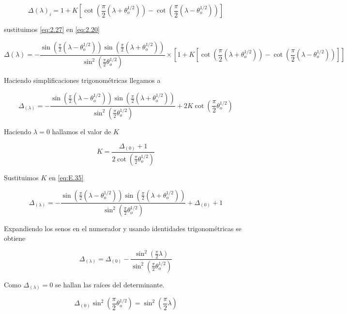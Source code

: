  \begin{equation}\label{eq:2.27}
     \Delta(\lambda)_{i}=1+K[\cot(\frac{\pi}{2}(\lambda+\theta_o^{1/2}))-\cot(\frac{\pi}{2}(\lambda-\theta_o^{1/2}))]
 \end{equation}
  
 sustituimos \ref{eq:2.27} en \ref{eq:2.20}
 
 \begin{equation}\label{eq:E.33}
    \Delta(\lambda)= -\frac{\sin(\frac{\pi}{2}(\lambda-\theta_o^{1/2}))\sin(\frac{\pi}{2}(\lambda+ \theta_o^{1/2}))}{\sin^2(\frac{\pi}{2}\theta_o^{1/2})}\times\left[1+K\left[\cot(\frac{\pi}{2}(\lambda+\theta_o^{1/2}))-\cot(\frac{\pi}{2}(\lambda-\theta_o^{1/2}))\right]\right]
\end{equation}

Haciendo simplificaciones trigonométricas llegamos a

\begin{equation}\label{eq:E.35}
    \Delta_{(\lambda)}= -\frac{\sin(\frac{\pi}{2}(\lambda-\theta_o^{1/2}))\sin(\frac{\pi}{2}(\lambda+ \theta_o^{1/2}))}{\sin^2(\frac{\pi}{2}\theta_o^{1/2})}+2K\cot(\frac{\pi}{2}\theta_o^{1/2})
\end{equation}

Haciendo $\lambda=0$ hallamos el valor de $K$

\begin{equation}\label{eq:E.36}
    K= \frac{\Delta_{(0)}+1}{2\cot(\frac{\pi}{2}\theta_o^{1/2})}
\end{equation}

Sustituimos $K$ en \ref{eq:E.35}

\begin{equation}\label{eq:E.37}
    \Delta_{(\lambda)}= -\frac{\sin(\frac{\pi}{2}(\lambda-\theta_o^{1/2}))\sin(\frac{\pi}{2}(\lambda+ \theta_o^{1/2}))}{\sin^2(\frac{\pi}{2}\theta_o^{1/2})}+\Delta_{(0)}+1
\end{equation}

Expandiendo los senos en el numerador y usando identidades trigonométricas se obtiene


\begin{equation}\label{eq:E.38}
\Delta_{(\lambda)}=\Delta_{(0)}-\frac{\sin^2(\frac{\pi}{2}\lambda)}{\sin^2(\frac{\pi}{2}\theta_o^{1/2})}
\end{equation}

Como $\Delta_{(\lambda)}=0$ se hallan las raíces del determinante.

\begin{equation}\label{eq:E.39}
\Delta_{(0)}\sin^2(\frac{\pi}{2}\theta_o^{1/2})=\sin^2(\frac{\pi}{2}\lambda)
\end{equation}

